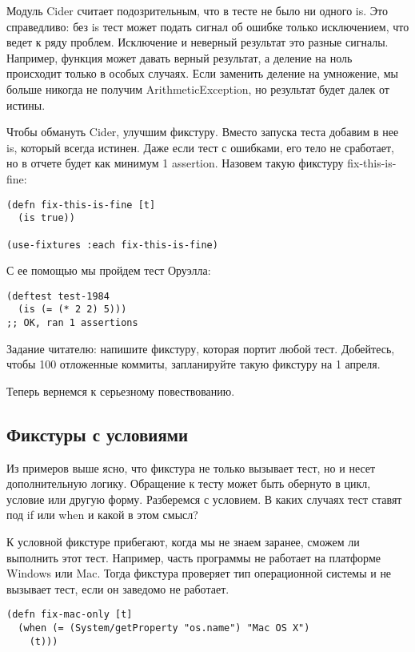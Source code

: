 Модуль Cider считает подозрительным, что в тесте не было ни одного is. Это
справедливо: без is тест может подать сигнал об ошибке только исключением, что
ведет к ряду проблем. Исключение и неверный результат это разные
сигналы. Например, функция может давать верный результат, а деление на ноль
происходит только в особых случаях. Если заменить деление на умножение, мы
больше никогда не получим ArithmeticException, но результат будет далек от
истины.

Чтобы обмануть Cider, улучшим фикстуру. Вместо запуска теста добавим в нее is,
который всегда истинен. Даже если тест с ошибками, его тело не сработает, но в
отчете будет как минимум 1 assertion. Назовем такую фикстуру fix-this-is-fine:

\begin{verbatim}
(defn fix-this-is-fine [t]
  (is true))

(use-fixtures :each fix-this-is-fine)
\end{verbatim}

С ее помощью мы пройдем тест Оруэлла:

\begin{verbatim}
(deftest test-1984
  (is (= (* 2 2) 5)))
;; OK, ran 1 assertions
\end{verbatim}

Задание читателю: напишите фикстуру, которая портит любой тест. Добейтесь, чтобы
100%
отложенные коммиты, запланируйте такую фикстуру на 1 апреля.

Теперь вернемся к серьезному повествованию.

\subsection{Фикстуры с условиями}

Из примеров выше ясно, что фикстура не только вызывает тест, но и несет
дополнительную логику. Обращение к тесту может быть обернуто в цикл, условие или
другую форму. Разберемся с условием. В каких случаях тест ставят под if или when
и какой в этом смысл?

К условной фикстуре прибегают, когда мы не знаем заранее, сможем ли выполнить
этот тест. Например, часть программы не работает на платформе Windows или
Mac. Тогда фикстура проверяет тип операционной системы и не вызывает тест, если
он заведомо не работает.

\begin{verbatim}
(defn fix-mac-only [t]
  (when (= (System/getProperty "os.name") "Mac OS X")
    (t)))
\end{verbatim}

